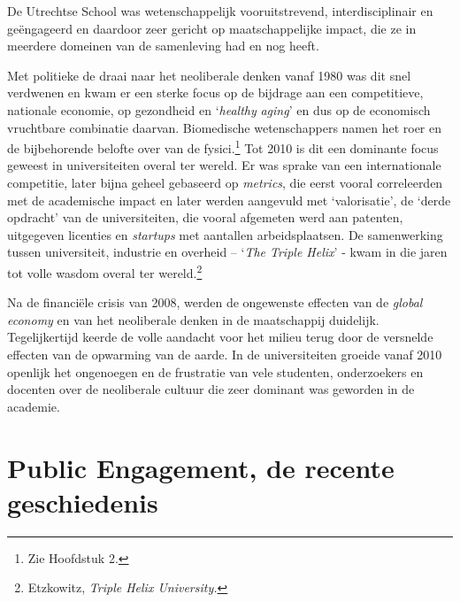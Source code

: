 \documentclass[smallauthor, chapterhaspagenum, nochapterinheader, pagenuminheader,  bigchapnum,medium2, tocpages, garamond, titleinheader]{jote-book}
\begin{document}
	 De Utrechtse School was wetenschappelijk vooruitstrevend, interdisciplinair en geëngageerd en daardoor zeer gericht op maatschappelijke impact, die ze in meerdere domeinen van de samenleving had en nog heeft.



	Met politieke de draai naar het neoliberale denken vanaf 1980 was dit snel verdwenen en kwam er een sterke focus op de bijdrage aan een competitieve, nationale economie, op gezondheid en ‘\emph{healthy}\emph{ }\emph{aging}' en dus op de economisch vruchtbare combinatie daarvan. Biomedische wetenschappers namen het roer en de bijbehorende belofte over van de fysici.\footnote{Zie Hoofdstuk 2.} Tot 2010 is dit een dominante focus geweest in universiteiten overal ter wereld. Er was sprake van een internationale competitie, later bijna geheel gebaseerd op \emph{metrics}, die eerst vooral correleerden met de academische impact en later werden aangevuld met ‘valorisatie', de ‘derde opdracht' van de universiteiten, die vooral afgemeten werd aan patenten, uitgegeven licenties en \emph{startups} met aantallen arbeidsplaatsen. De samenwerking tussen universiteit, industrie en overheid -- ‘\emph{The Triple Helix}' - kwam in die jaren tot volle wasdom overal ter wereld.\footnote{Etzkowitz, \emph{Triple Helix University}\emph{.}}



	Na de financiële crisis van 2008, werden de ongewenste effecten van de \emph{global}\emph{ }\emph{economy} en van het neoliberale denken in de maatschappij duidelijk. Tegelijkertijd keerde de volle aandacht voor het milieu terug door de versnelde effecten van de opwarming van de aarde. In de universiteiten groeide vanaf 2010 openlijk het ongenoegen en de frustratie van vele studenten, onderzoekers en docenten over de neoliberale cultuur die zeer dominant was geworden in de academie.



	\section{Public Engagement, de recente geschiedenis}
\end{document}
